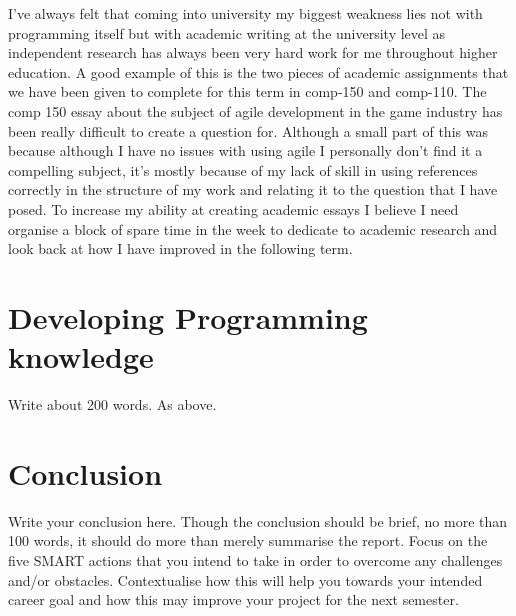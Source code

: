 \documentclass{scrartcl}
\begin{document}
I've always felt that coming into university my biggest weakness lies not with programming itself but with academic writing at the university level as independent research has always been very hard work for me throughout higher education. A good example of this is the two pieces of academic assignments that we have been given to complete for this term in comp-150 and comp-110. The comp 150 essay about the subject of agile development in the game industry has been really difficult to create a question for. Although a small part of this was because although I have no issues with using agile I personally don't find it a compelling subject, it's mostly because of my lack of skill in using references correctly in the structure of my work and relating it to the question that I have posed. To increase my ability at creating academic essays I believe I need organise a block of spare time in the week to dedicate to academic research and look back at how I have improved in the following term.
\section{Developing Programming knowledge}

Write about 200 words. As above.


\section{Conclusion}

Write your conclusion here. Though the conclusion should be brief, no more than 100 words, it should do more than merely summarise the report. Focus on the five SMART actions that you intend to take in order to overcome any challenges and/or obstacles. Contextualise how this will help you towards your intended career goal and how this may improve your project for the next semester.



\end{document}
